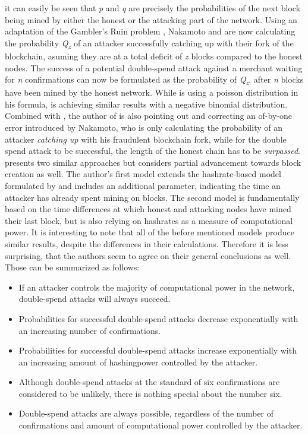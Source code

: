 \documentclass[a4paper,12pt,twoside]{report}
\begin{document}
it can easily be seen that \textit{p} and \textit{q} are precisely the probabilities of the next block being mined by either the honest or the attacking part of the network. Using an adaptation of the Gambler's Ruin problem \cite{gamblersruin}, Nakamoto and \cite{HBDSA} are now calculating the probability \textit{Q\textsubscript{z}} of an attacker successfully catching up with their fork of the blockchain, asuming they are at a total deficit of \textit{z} blocks compared to the honest nodes. The success of a potential double-spend attack against a merchant waiting for \textit{n} confirmations can now be formulated as the probability of \textit{Q\textsubscript{z}}, after \textit{n} blocks have been mined by the honest network. While \cite{nakamoto2008bitcoin} is using a poisson distribution in his formula, \cite{HBDSA} is achieving similar results with a negative binomial distribution. Combined with \cite{NakamotoDSACorrection}, the author of \cite{HBDSA} is also pointing out and correcting an of-by-one error introduced by Nakamoto, who is only calculating the probability of an attacker \textit{catching up} with his fraudulent blockchain fork, while for the double spend attack to be successful, the length of the honest chain has to be \textit{surpassed}. \cite{DSAwithTime} presents two similar approaches but considers partial advancement towards block creation as well. The author's first model extends the hashrate-based model formulated by \cite{HBDSA} and includes an additional parameter, indicating the time an attacker has already spent mining on blocks. The second model is fundamentally based on the time differences at which honest and attacking nodes have mined their last block, but is also relying on hashrates as a measure of computational power.
It is interesting to note that all of the before mentioned models produce similar results, despite the differences in their calculations. Therefore it is less surprising, that the authors seem to agree on their general conclusions as well. Those can be summarized as follows:
\begin{itemize}
\item If an attacker controls the majority of computational power in the network, double-spend attacks will always succeed.
\item Probabilities for successful double-spend attacks decrease exponentially with an increasing number of confirmations.
\item Probabilities for successful double-spend attacks increase exponentially with an increasing amount of hashingpower controlled by the attacker.
\item Although double-spend attacks at the standard of six confirmations are considered to be unlikely, there is nothing special about the number six.
\item Double-spend attacks are always possible, regardless of the number of confirmations and amount of computational power controlled by the attacker.
\end{itemize}
\end{document}
